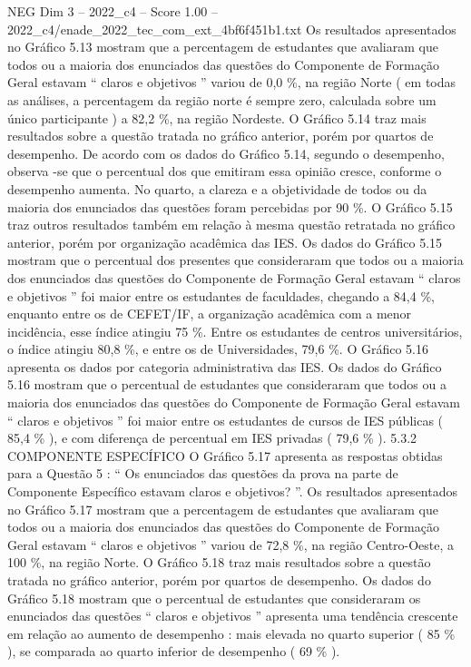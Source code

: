 \begin{textsample}{NEG Dim 3 – 2022\_c4 – Score 1.00 – 2022\_c4/enade\_2022\_tec\_com\_ext\_4bf6f451b1.txt}
Os resultados apresentados no Gráfico 5.13 mostram que a percentagem de estudantes que avaliaram que todos ou a maioria dos enunciados das questões do Componente de Formação Geral estavam “ claros e objetivos ” variou de 0,0 \%, na região Norte ( em todas as análises, a percentagem da região norte é sempre zero, calculada sobre um único participante ) a 82,2 \%, na região Nordeste.
O Gráfico 5.14 traz mais resultados sobre a questão tratada no gráfico anterior, porém por quartos de desempenho.
De acordo com os dados do Gráfico 5.14, segundo o desempenho, observa -se que o percentual dos que emitiram essa opinião cresce, conforme o desempenho aumenta.
No quarto, a clareza e a objetividade de todos ou da maioria dos enunciados das questões foram percebidas por 90 \%.
O Gráfico 5.15 traz outros resultados também em relação à mesma questão retratada no gráfico anterior, porém por organização acadêmica das IES.
Os dados do Gráfico 5.15 mostram que o percentual dos presentes que consideraram que todos ou a maioria dos enunciados das questões do Componente de Formação Geral estavam “ claros e objetivos ” foi maior entre os estudantes de faculdades, chegando a 84,4 \%, enquanto entre os de CEFET/IF, a organização acadêmica com a menor incidência, esse índice atingiu 75 \%.
Entre os estudantes de centros universitários, o índice atingiu 80,8 \%, e entre os de Universidades, 79,6 \%.
O Gráfico 5.16 apresenta os dados por categoria administrativa das IES.
Os dados do Gráfico 5.16 mostram que o percentual de estudantes que consideraram que todos ou a maioria dos enunciados das questões do Componente de Formação Geral estavam “ claros e objetivos ” foi maior entre os estudantes de cursos de IES públicas ( 85,4 \% ), e com diferença de percentual em IES privadas ( 79,6 \% ). 5.3.2 COMPONENTE ESPECÍFICO O Gráfico 5.17 apresenta as respostas obtidas para a Questão 5 : “ Os enunciados das questões da prova na parte de Componente Específico estavam claros e objetivos? ”.
Os resultados apresentados no Gráfico 5.17 mostram que a percentagem de estudantes que avaliaram que todos ou a maioria dos enunciados das questões do Componente de Formação Geral estavam “ claros e objetivos ” variou de 72,8 \%, na região Centro-Oeste, a 100 \%, na região Norte.
O Gráfico 5.18 traz mais resultados sobre a questão tratada no gráfico anterior, porém por quartos de desempenho.
Os dados do Gráfico 5.18 mostram que o percentual de estudantes que consideraram os enunciados das questões “ claros e objetivos ” apresenta uma tendência crescente em relação ao aumento de desempenho : mais elevada no quarto superior ( 85 \% ), se comparada ao quarto inferior de desempenho ( 69 \% ).

\end{textsample}
